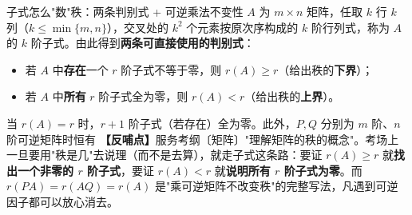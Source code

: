 %
%
%


\begin{fdeep}{子式怎么"数"秩：两条判别式 + 可逆乘法不变性}
$A$ 为 $m\times n$ 矩阵，任取 $k$ 行 $k$ 列（$k\le\min\{m,n\}$），交叉处的 $k^{2}$ 个元素按原次序构成的 $k$ 阶行列式，称为 $A$ 的 $k$ 阶子式。由此得到\textbf{两条可直接使用的判别式}：
\begin{itemize}[leftmargin=2.2em,itemsep=0.22em]
\item 若 $A$ 中\textbf{存在}一个 $r$ 阶子式不等于零，则 $r(A)\ge r$（给出秩的\textbf{下界}）；
\item 若 $A$ 中\textbf{所有} $r$ 阶子式全为零，则 $r(A)<r$（给出秩的\textbf{上界}）。
\end{itemize}
当 $r(A)=r$ 时，$r+1$ 阶子式（若存在）全为零。此外，$P,Q$ 分别为 $m$ 阶、$n$ 阶可逆矩阵时恒有
\textbf{【反哺点】}服务考纲〔矩阵〕"理解矩阵的秩的概念"。考场上一旦要用"秩是几"去说理（而不是去算），就走子式这条路：要证 $r(A)\ge r$ 就\textbf{找出一个非零的 $r$ 阶子式}，要证 $r(A)<r$ 就\textbf{说明所有 $r$ 阶子式为零}。而 $r(PA)=r(AQ)=r(A)$ 是"乘可逆矩阵不改变秩"的完整写法，凡遇到可逆因子都可以放心消去。
\end{fdeep}


